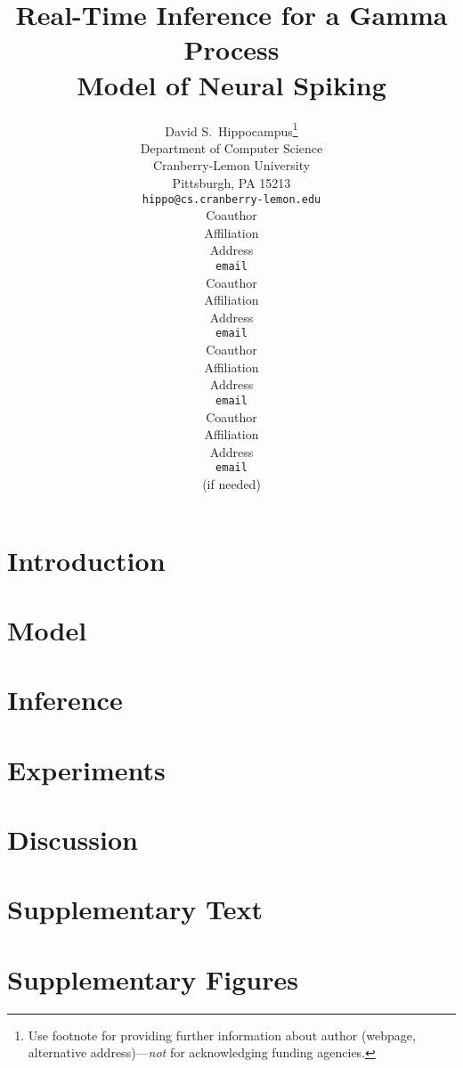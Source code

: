\documentclass{article} %
\title{Real-Time Inference for a Gamma Process \\ Model of Neural Spiking}
\author{
David S.~Hippocampus\thanks{ Use footnote for providing further information
about author (webpage, alternative address)---\emph{not} for acknowledging
funding agencies.} \\
Department of Computer Science\\
Cranberry-Lemon University\\
Pittsburgh, PA 15213 \\
\texttt{hippo@cs.cranberry-lemon.edu} \\
\And
Coauthor \\
Affiliation \\
Address \\
\texttt{email} \\
\AND
Coauthor \\
Affiliation \\
Address \\
\texttt{email} \\
\And
Coauthor \\
Affiliation \\
Address \\
\texttt{email} \\
\And
Coauthor \\
Affiliation \\
Address \\
\texttt{email} \\
(if needed)\\
}
\begin{document}
 


\maketitle

\vspace{-.2in}
\begin{abstract}

\end{abstract}

\section{Introduction}



 
\section{Model}


\section{Inference} \label{sec:inf}



\section{Experiments}


 
\section{Discussion}




\begin{comment}
\subsubsection*{Acknowledgments}

Use unnumbered third level headings for the acknowledgments. All
acknowledgments go at the end of the paper. Do not include 
acknowledgments in the anonymized submission, only in the 
final paper. 
\end{comment}

\clearpage
{\small


}

\clearpage
\appendix

\section{Supplementary Text}


\section{Supplementary Figures}

\end{document}
